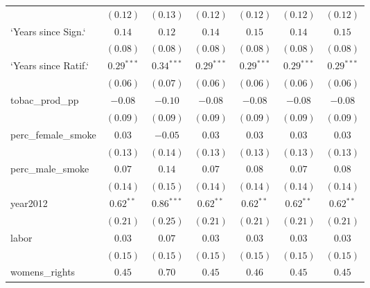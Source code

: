 \begin{table}[!h]
\begin{center}
\begin{tabular}{l c c c c c c }
                        & $(0.12)$      & $(0.13)$      & $(0.12)$      & $(0.12)$      & $(0.12)$      & $(0.12)$      \\
`Years since Sign.`     & $0.14$        & $0.12$        & $0.14$        & $0.15$        & $0.14$        & $0.15$        \\
                        & $(0.08)$      & $(0.08)$      & $(0.08)$      & $(0.08)$      & $(0.08)$      & $(0.08)$      \\
`Years since Ratif.`    & $0.29^{***}$  & $0.34^{***}$  & $0.29^{***}$  & $0.29^{***}$  & $0.29^{***}$  & $0.29^{***}$  \\
                        & $(0.06)$      & $(0.07)$      & $(0.06)$      & $(0.06)$      & $(0.06)$      & $(0.06)$      \\
tobac\_prod\_pp         & $-0.08$       & $-0.10$       & $-0.08$       & $-0.08$       & $-0.08$       & $-0.08$       \\
                        & $(0.09)$      & $(0.09)$      & $(0.09)$      & $(0.09)$      & $(0.09)$      & $(0.09)$      \\
perc\_female\_smoke     & $0.03$        & $-0.05$       & $0.03$        & $0.03$        & $0.03$        & $0.03$        \\
                        & $(0.13)$      & $(0.14)$      & $(0.13)$      & $(0.13)$      & $(0.13)$      & $(0.13)$      \\
perc\_male\_smoke       & $0.07$        & $0.14$        & $0.07$        & $0.08$        & $0.07$        & $0.08$        \\
                        & $(0.14)$      & $(0.15)$      & $(0.14)$      & $(0.14)$      & $(0.14)$      & $(0.14)$      \\
year2012                & $0.62^{**}$   & $0.86^{***}$  & $0.62^{**}$   & $0.62^{**}$   & $0.62^{**}$   & $0.62^{**}$   \\
                        & $(0.21)$      & $(0.25)$      & $(0.21)$      & $(0.21)$      & $(0.21)$      & $(0.21)$      \\
labor                   & $0.03$        & $0.07$        & $0.03$        & $0.03$        & $0.03$        & $0.03$        \\
                        & $(0.15)$      & $(0.15)$      & $(0.15)$      & $(0.15)$      & $(0.15)$      & $(0.15)$      \\
womens\_rights          & $0.45$        & $0.70$        & $0.45$        & $0.46$        & $0.45$        & $0.45$        \\

\end{tabular}
\end{center}
\end{table}

